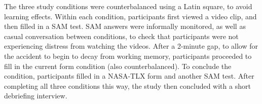 \documentclass[../main/Feedback.tex]{subfiles}
\begin{document}
The three study conditions were counterbalanced using a Latin square, to avoid learning effects. Within each condition, participants first viewed a video clip, and then filled in a SAM test. SAM answers were informally monitored, as well as casual conversation between conditions, to check that participants were not experiencing distress from watching the videos. After a 2-minute gap, to allow for the accident to begin to decay from working memory, participants proceeded to fill in the current form condition (also counterbalanced). To conclude the condition, participants filled in a NASA-TLX form and another SAM test.
After completing all three conditions this way, the study then concluded with a short debriefing interview.
\end{document}
